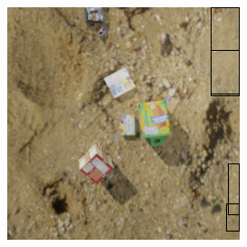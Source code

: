 \documentclass[13.5pt,aspecratio=169, xcolor=dvipsnames]{beamer}
\begin{document}
\begin{frame}
\begin{figure}
\begin{subfigure}{0.5\textwidth}
              \includegraphics[width=\linewidth]{Example/Output/SM_3_2.png}
              \captionsetup{labelformat=empty}
            \end{subfigure}
            \captionsetup{labelformat=empty}
        \end{figure}

    \end{frame}

\end{document}
